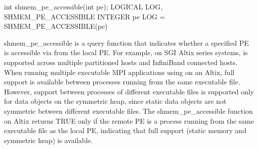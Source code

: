 \synC     
int shmem_pe_accessible(int pe);
\synF
LOGICAL LOG, SHMEM_PE_ACCESSIBLE
INTEGER pe
LOG = SHMEM_PE_ACCESSIBLE(pe)

{
       shmem\_pe\_accessible is  a  query function  that indicates  whether  a
       specified PE is accessible via \openshmem from the local PE. For example, on  SGI	Altix  series  systems, \openshmem	is  supported  across multiple
       partitioned hosts and InfiniBand connected hosts. When running multiple executable MPI applications using \openshmem on an Altix,
       full \openshmem support is available between processes running from the same
       executable file. However, \openshmem support between processes of different
       executable  files  is  supported only for data objects on the symmetric
       heap, since static data objects are  not symmetric  between  different
       executable  files. The shmem\_pe\_accessible function on Altix returns
       TRUE only if  the  remote  PE  is  a  process  running  from  the  same
       executable  file	 as  the  local PE, indicating that full \openshmem support
       (static memory and symmetric heap) is available.
}
{

\notesB{}
}

\eAPI